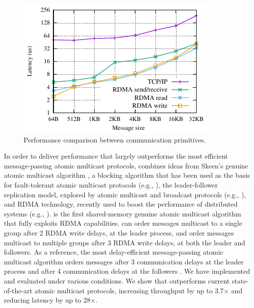 \begin{figure}[htp!]
    \centering
    \includegraphics[width=0.99\columnwidth]{figures/benchmark/graphs/figure-protocol-bench.pdf}
  \caption{Performance comparison between communication primitives.}
  \label{fig:perfcomp}
\end{figure}

In order to deliver performance that largely outperforms the most efficient message-passing atomic multicast protocols, \libname combines ideas from Skeen's genuine atomic multicast algorithm \cite{BJ87b}, a blocking algorithm that has been used as the basis for fault-tolerant atomic multicast protocols (e.g., \cite{Coelho2017,gotsman2019white}), the leader-follower replication model, explored by atomic multicast and broadcast protocols (e.g., \cite{gotsman2019white,Junqueira2011,Mu,delta4}), and RDMA technology, recently used to boost the performance of distributed systems (e.g., \cite{Aguilera2019,kalia2014using, kalia2016design, mitchell2013using}).
%
\libname is the first shared-memory genuine atomic multicast algorithm that fully exploits RDMA capabilities.
\libname can order messages multicast to a single group after 2 RDMA write delays, at the leader process, and order messages multicast to multiple groups after 3 RDMA write delays, at both the leader and followers. As a reference, the most delay-efficient message-passing atomic multicast algorithm orders messages after 3 communication delays at the leader process and after 4 communication delays at the followers \cite{gotsman2019white}.
We have implemented and evaluated \libname under various conditions. 
We show that \libname outperforms current state-of-the-art atomic multicast protocols, increasing throughput by up to 3.7$\times$ and reducing latency by up to 28$\times$.

